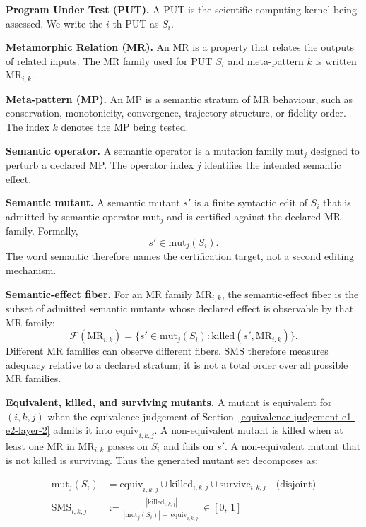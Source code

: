\documentclass[12pt]{article}
\begin{document}
\textbf{Program Under Test (PUT).} A PUT is the scientific-computing
kernel being assessed. We write the \(i\)-th PUT as \(S_i\).

\textbf{Metamorphic Relation (MR).} An MR is a property that relates the
outputs of related inputs. The MR family used for PUT \(S_i\) and
meta-pattern \(k\) is written \(\mathrm{MR}_{i,k}\).

\textbf{Meta-pattern (MP).} An MP is a semantic stratum of MR behaviour,
such as conservation, monotonicity, convergence, trajectory structure, or
fidelity order. The index \(k\) denotes the MP being tested.

\textbf{Semantic operator.} A semantic operator is a mutation family
\(\mathrm{mut}_j\) designed to perturb a declared MP. The operator index
\(j\) identifies the intended semantic effect.

\textbf{Semantic mutant.} A semantic mutant \(s'\) is a finite syntactic
edit of \(S_i\) that is admitted by semantic operator \(\mathrm{mut}_j\)
and is certified against the declared MR family. Formally,
\[
  s' \in \mathrm{mut}_j(S_i).
\]
The word semantic therefore names the certification target, not a second
editing mechanism.

\textbf{Semantic-effect fiber.} For an MR family \(\mathrm{MR}_{i,k}\),
the semantic-effect fiber is the subset of admitted semantic mutants
whose declared effect is observable by that MR family:
\[
  \mathcal{F}(\mathrm{MR}_{i,k}) =
  \{s' \in \mathrm{mut}_j(S_i): \mathrm{killed}(s', \mathrm{MR}_{i,k})\}.
\]
Different MR families can observe different fibers. SMS therefore
measures adequacy relative to a declared stratum; it is not a total order
over all possible MR families.

\textbf{Equivalent, killed, and surviving mutants.} A mutant is
equivalent for \((i,k,j)\) when the equivalence judgement of Section~\ref{equivalence-judgement-e1-e2-layer-2} admits
it into \(\mathrm{equiv}_{i,k,j}\). A non-equivalent mutant is killed when
at least one MR in \(\mathrm{MR}_{i,k}\) passes on \(S_i\) and fails on
\(s'\). A non-equivalent mutant that is not killed is surviving. Thus
the generated mutant set decomposes as:

\begin{align*}
\mathrm{mut}_j(S_i) &= \mathrm{equiv}_{i,k,j} \cup \mathrm{killed}_{i,k,j} \cup \mathrm{survive}_{i,k,j} \quad \text{(disjoint)} \\
\mathrm{SMS}_{i,k,j} &:= \frac{|\mathrm{killed}_{i,k,j}|}{|\mathrm{mut}_j(S_i)| - |\mathrm{equiv}_{i,k,j}|} \in [0,\,1]
\end{align*}
\end{document}
